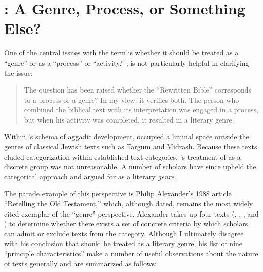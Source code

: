 
\section{\RWB: A Genre, Process, or Something Else?}

 One of the central issues with the term \RwB is whether it should be treated as a ``genre'' or as a ``process'' or ``activity.'' \vermes, is not particularly helpful in clarifying the issue: 

\begin{quote}
    The question has been raised whether the ``Rewritten Bible'' corresponds to a process or a genre? In my view, it verifies both. The person who combined the biblical text with its interpretation was engaged in a process, but when his activity was completed, it resulted in a literary genre.\autocite[8]{vermes_zsengeller2014}
\end{quote} 

Within \vermes's schema of aggadic development, \rwb occupied a liminal space outside the genres of classical Jewish texts such as Targum and Midrash. Because these texts eluded categorization within  established text categories, \vermes's treatment of \rwb as a discrete group was not unreasonable. A number of scholars have since upheld the categorical approach and argued for \rwb as a literary \emph{genre}. 

The parade example of this perspective is Philip Alexander's 1988 article ``Retelling the Old Testament,'' which, although dated, remains the most widely cited exemplar of the ``genre'' perspective.\autocites{alexander_carson-williamson1988}[\vermes himself even put his stamp of approval on it, see][4]{vermes_zsengeller2014} Alexander takes up four \rwB texts (\jub, \ga, \lab, and \ant) to determine whether there exists a set of concrete criteria by which scholars can admit or exclude texts from the category. Although I ultimately disagree with his conclusion that \rwb should be treated as a literary genre, his list of nine ``principle characteristics'' make a number of useful observations about the nature of \rwb texts generally and are summarized as follows: 

